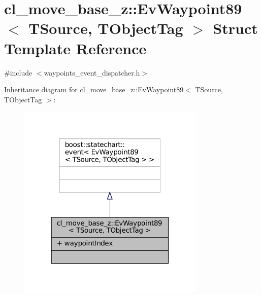\hypertarget{structcl__move__base__z_1_1EvWaypoint89}{}\section{cl\+\_\+move\+\_\+base\+\_\+z\+:\+:Ev\+Waypoint89$<$ T\+Source, T\+Object\+Tag $>$ Struct Template Reference}
\label{structcl__move__base__z_1_1EvWaypoint89}


{\ttfamily \#include $<$waypoints\+\_\+event\+\_\+dispatcher.\+h$>$}



Inheritance diagram for cl\+\_\+move\+\_\+base\+\_\+z\+:\+:Ev\+Waypoint89$<$ T\+Source, T\+Object\+Tag $>$\+:
\nopagebreak
\begin{figure}[H]
\begin{center}
\leavevmode
\includegraphics[width=253pt]{structcl__move__base__z_1_1EvWaypoint89__inherit__graph}
\end{center}
\end{figure}


